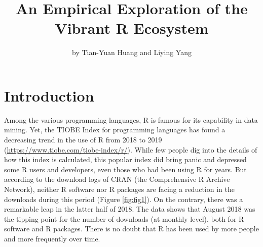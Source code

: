 \title{An Empirical Exploration of the Vibrant R Ecosystem}
\author{by Tian-Yuan Huang and Liying Yang}

\maketitle


\hypertarget{introduction}{%
\section{Introduction}\label{introduction}}

Among the various programming languages, R is famous for its capability
in data mining. Yet, the TIOBE Index for programming languages has found
a decreasing trend in the use of R from 2018 to 2019
(\url{https://www.tiobe.com/tiobe-index/r/}). While few people dig into
the details of how this index is calculated, this popular index did
bring panic and depressed some R users and developers, even those who
had been using R for years. But according to the download logs of CRAN
(the Comprehensive R Archive Network), neither R software nor R packages
are facing a reduction in the downloads during this period (Figure
\ref{fig:fig1}). On the contrary, there was a remarkable leap in the
latter half of 2018. The data shows that August 2018 was the tipping
point for the number of downloads (at monthly level), both for R
software and R packages. There is no doubt that R has been used by more
people and more frequently over time.

